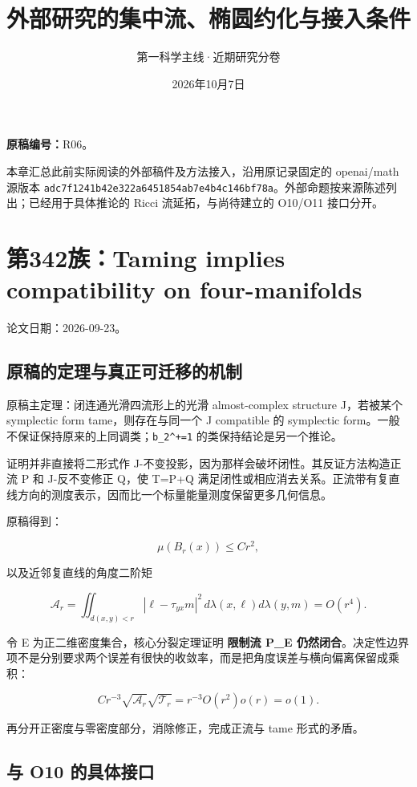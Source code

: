 \documentclass[UTF8,11pt,fontset=none]{ctexart}
\title{外部研究的集中流、椭圆约化与接入条件}
\author{第一科学主线·近期研究分卷}
\date{2026年10月7日}
\begin{document}
\maketitle
\noindent\textbf{原稿编号：}R06。

本章汇总此前实际阅读的外部稿件及方法接入，沿用原记录固定的 openai/math 源版本 \texttt{adc7f1241b42e322a6451854ab7e4b4c146bf78a}。外部命题按来源陈述列出；已经用于具体推论的 Ricci 流延拓，与尚待建立的 O10/O11 接口分开。\cite{R06,R07}

\section{第342族：Taming implies compatibility on four-manifolds}\label{ch6:ux7b2c342ux65cftaming-implies-compatibility-on-four-manifolds}

论文日期：2026-09-23。\cite{OAI342}

\subsection{原稿的定理与真正可迁移的机制}\label{ch6:ux539fux7a3fux7684ux5b9aux7406ux4e0eux771fux6b63ux53efux8fc1ux79fbux7684ux673aux5236}

原稿主定理：闭连通光滑四流形上的光滑 almost-complex structure J，若被某个 symplectic form tame，则存在与同一个 J compatible 的 symplectic form。一般不保证保持原来的上同调类；\texttt{b\_2\^{}+=1} 的类保持结论是另一个推论。

证明并非直接将二形式作 J-不变投影，因为那样会破坏闭性。其反证方法构造正流 P 和 J-反不变修正 Q，使 T=P+Q 满足闭性或相应消去关系。正流带有复直线方向的测度表示，因而比一个标量能量测度保留更多几何信息。

原稿得到：

\[
\mu(B_r(x))\le Cr^2,
\]

以及近邻复直线的角度二阶矩

\[
\mathcal A_r=\iint_{d(x,y)<r}|\ell-\tau_{yx}m|^2\,d\lambda(x,\ell)d\lambda(y,m)
=O(r^4).
\]

令 E 为正二维密度集合，核心分裂定理证明 \textbf{限制流 P\_E 仍然闭合}。决定性边界项不是分别要求两个误差有很快的收敛率，而是把角度误差与横向偏离保留成乘积：

\[
Cr^{-3}\sqrt{\mathcal A_r}\sqrt{\mathcal T_r}
=r^{-3}O(r^2)o(r)=o(1).
\]

再分开正密度与零密度部分，消除修正，完成正流与 tame 形式的矛盾。

\subsection{与 O10 的具体接口}\label{ch6:ux4e0e-o10-ux7684ux5177ux4f53ux63a5ux53e3}
\end{document}
